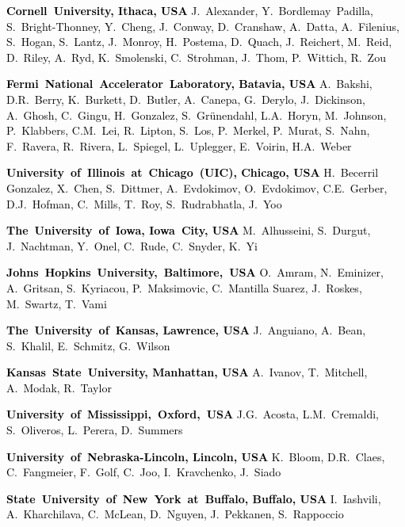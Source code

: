 \textcolor{black}{\textbf{Cornell~University, Ithaca, USA}\newline
J.~Alexander, Y.~Bordlemay~Padilla, S.~Bright-Thonney, Y.~Cheng, J.~Conway, D.~Cranshaw, A.~Datta, A.~Filenius, S.~Hogan, S.~Lantz, J.~Monroy, H.~Postema, D.~Quach, J.~Reichert, M.~Reid, D.~Riley, A.~Ryd, K.~Smolenski, C.~Strohman, J.~Thom, P.~Wittich, R.~Zou}

\textcolor{black}{
\textbf{Fermi~National~Accelerator~Laboratory, Batavia, USA}\newline
A.~Bakshi, D.R.~Berry, K.~Burkett, D.~Butler, A.~Canepa, G.~Derylo, J.~Dickinson, A.~Ghosh, C.~Gingu, H.~Gonzalez, S.~Gr\"{u}nendahl, L.A.~Horyn, M.~Johnson, P.~Klabbers, C.M.~Lei, R.~Lipton, S.~Los, P.~Merkel, P.~Murat, S.~Nahn, F.~Ravera, R.~Rivera, L.~Spiegel, L.~Uplegger, E.~Voirin, H.A.~Weber}


\textcolor{black}{\textbf{University~of~Illinois~at~Chicago~(UIC), Chicago, USA}\newline
H.~Becerril Gonzalez, X.~Chen, S.~Dittmer, A.~Evdokimov, O.~Evdokimov, C.E.~Gerber, D.J.~Hofman, C.~Mills, T.~Roy, S.~Rudrabhatla, J.~Yoo}

\textcolor{black}{\textbf{The~University~of~Iowa, Iowa~City, USA}\newline
M.~Alhusseini, S.~Durgut, J.~Nachtman, Y.~Onel, C.~Rude, C.~Snyder, K.~Yi}

\textcolor{black}{\textbf{Johns~Hopkins~University,~Baltimore,~USA}\newline
O.~Amram, N.~Eminizer, A.~Gritsan, S.~Kyriacou, P.~Maksimovic, C.~Mantilla Suarez, J.~Roskes, M.~Swartz, T.~Vami}


\textcolor{black}{\textbf{The~University~of~Kansas, Lawrence, USA}\newline
J.~Anguiano, A.~Bean, S.~Khalil, E.~Schmitz, G.~Wilson}

\textcolor{black}{\textbf{Kansas~State~University, Manhattan, USA}\newline
A.~Ivanov, T.~Mitchell, A.~Modak, R.~Taylor}

\textcolor{black}{\textbf{University~of~Mississippi,~Oxford,~USA}\newline
J.G.~Acosta, L.M.~Cremaldi, S.~Oliveros, L.~Perera, D.~Summers}

\textcolor{black}{\textbf{University~of~Nebraska-Lincoln, Lincoln, USA}\newline
K.~Bloom, D.R.~Claes, C.~Fangmeier, F.~Golf, C.~Joo, I.~Kravchenko, J.~Siado}

\textcolor{black}{\textbf{State~University~of~New~York~at~Buffalo, Buffalo, USA}\newline
I.~Iashvili, A.~Kharchilava, C.~McLean, D.~Nguyen, J.~Pekkanen, S.~Rappoccio}


